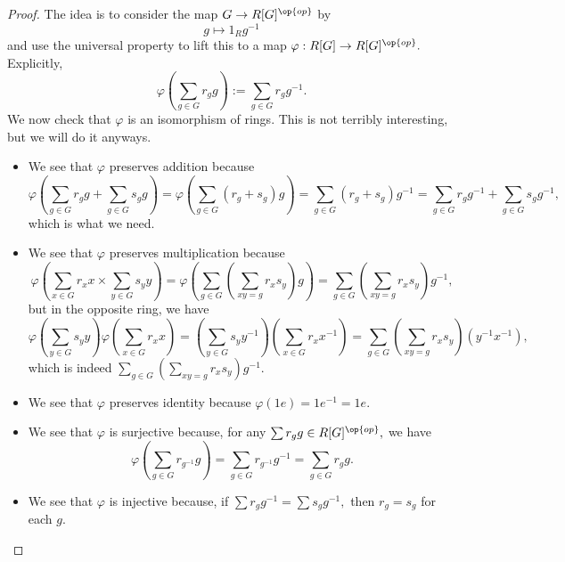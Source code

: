\begin{proof}
	The idea is to consider the map $G\to R[G]^{\op{op}}$ by
	\[g\mapsto1_Rg^{-1}\]
	and use the universal property to lift this to a map $\varphi:R[G]\to R[G]^{\op{op}}.$ Explicitly,
	\[\varphi\left(\sum_{g\in G}r_gg\right):=\sum_{g\in G}r_gg^{-1}.\]
	We now check that $\varphi$ is an isomorphism of rings. This is not terribly interesting, but we will do it anyways.
	\begin{itemize}
		\item We see that $\varphi$ preserves addition because
		\[\varphi\left(\sum_{g\in G}r_gg+\sum_{g\in G}s_gg\right)=\varphi\left(\sum_{g\in G}(r_g+s_g)g\right)=\sum_{g\in G}(r_g+s_g)g^{-1}=\sum_{g\in G}r_gg^{-1}+\sum_{g\in G}s_gg^{-1},\]
		which is what we need.
		\item We see that $\varphi$ preserves multiplication because
		\[\varphi\left(\sum_{x\in G}r_xx\times\sum_{y\in G}s_yy\right)=\varphi\left(\sum_{g\in G}\left(\sum_{xy=g}r_xs_y\right)g\right)=\sum_{g\in G}\left(\sum_{xy=g}r_xs_y\right)g^{-1},\]
		but in the opposite ring, we have
		\[\varphi\left(\sum_{y\in G}s_yy\right)\varphi\left(\sum_{x\in G}r_xx\right)=\left(\sum_{y\in G}s_yy^{-1}\right)\left(\sum_{x\in G}r_xx^{-1}\right)=\sum_{g\in G}\left(\sum_{xy=g}r_xs_y\right)\left(y^{-1}x^{-1}\right),\]
		which is indeed $\sum_{g\in G}\left(\sum_{xy=g}r_xs_y\right)g^{-1}.$
		\item We see that $\varphi$ preserves identity because $\varphi(1e)=1e^{-1}=1e.$
		\item We see that $\varphi$ is surjective because, for any $\sum r_gg\in R[G]^{\op{op}},$ we have
		\[\varphi\left(\sum_{g\in G}r_{g^{-1}}g\right)=\sum_{g\in G}r_{g^{-1}}g^{-1}=\sum_{g\in G}r_gg.\]
		\item We see that $\varphi$ is injective because, if $\sum r_gg^{-1}=\sum s_gg^{-1},$ then $r_g=s_g$ for each $g.$
		\qedhere
	\end{itemize}
\end{proof}

